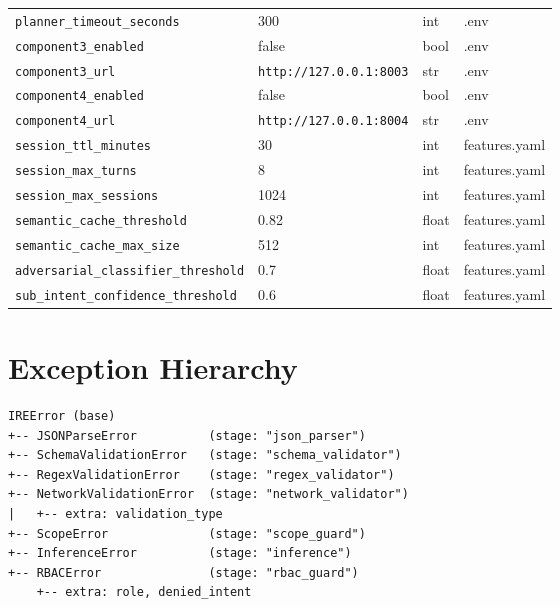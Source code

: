 \documentclass[10pt,journal,onecolumn]{IEEEtran}
\begin{document}
\begin{table}[t]
\begin{tabularx}{\textwidth}{>{\ttfamily}l X l l}
\texttt{planner\_timeout\_seconds} & 300 & int & .env\\
\texttt{component3\_enabled} & false & bool & .env\\
\texttt{component3\_url} & \texttt{http://127.0.0.1:8003} & str & .env\\
\texttt{component4\_enabled} & false & bool & .env\\
\texttt{component4\_url} & \texttt{http://127.0.0.1:8004} & str & .env\\
\texttt{session\_ttl\_minutes} & 30 & int & features.yaml\\
\texttt{session\_max\_turns} & 8 & int & features.yaml\\
\texttt{session\_max\_sessions} & 1024 & int & features.yaml\\
\texttt{semantic\_cache\_threshold} & 0.82 & float & features.yaml\\
\texttt{semantic\_cache\_max\_size} & 512 & int & features.yaml\\
\texttt{adversarial\_classifier\_threshold} & 0.7 & float & features.yaml\\
\texttt{sub\_intent\_confidence\_threshold} & 0.6 & float & features.yaml\\
\bottomrule
\end{tabularx}
\end{table}

\section{Exception Hierarchy}
\begin{lstlisting}
IREError (base)
+-- JSONParseError          (stage: "json_parser")
+-- SchemaValidationError   (stage: "schema_validator")
+-- RegexValidationError    (stage: "regex_validator")
+-- NetworkValidationError  (stage: "network_validator")
|   +-- extra: validation_type
+-- ScopeError              (stage: "scope_guard")
+-- InferenceError          (stage: "inference")
+-- RBACError               (stage: "rbac_guard")
    +-- extra: role, denied_intent
\end{lstlisting}
\end{document}
